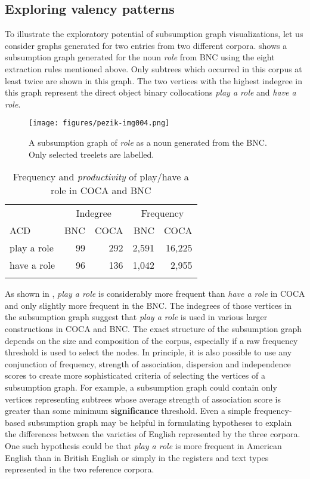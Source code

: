\documentclass[output=paper]{langscibook}
\begin{document}
\subsection{Exploring valency patterns}

To illustrate the exploratory potential of subsumption graph visualizations, let us consider graphs generated for two entries from two different corpora.  shows a subsumption graph generated for the noun \textit{role} from BNC using the eight extraction rules mentioned above. Only subtrees which occurred in this corpus at least twice are shown in this graph. The two vertices with the highest indegree in this graph represent the direct object binary collocations \textit{play a role} and \textit{have a role}. 

  
\begin{figure}[t]
\texttt{[image: figures/pezik-img004.png]}
\caption{A subsumption graph of \textit{role} as a noun generated from the BNC. Only selected treelets are labelled.\label{fig:pezik:4}}
\end{figure}


\begin{table}
\begin{tabular}{lrr rr}
\lsptoprule
& \multicolumn{2}{c}{Indegree} & \multicolumn{2}{c}{Frequency}\\\cmidrule(lr){2-3}\cmidrule(lr){4-5}
ACD & BNC & COCA & BNC & COCA\\\midrule
play a role & 99 & 292 & 2,591 & 16,225\\
have a role & 96 & 136 & 1,042 & 2,955\\
\lspbottomrule
\end{tabular}
\caption{\label{tab:pezik:11}Frequency and \textit{productivity} of play/have a role in COCA and BNC}
\end{table}

As shown in , \textit{play a role} is considerably more frequent than \textit{have a role} in COCA and only slightly more frequent in the BNC. The indegrees of those vertices in the subsumption graph suggest that \textit{play a role} is used in various larger constructions in COCA and BNC. The exact structure of the subsumption graph depends on the size and composition of the corpus, especially if a raw frequency threshold is used to select the nodes. In principle, it is also possible to use any conjunction of frequency, strength of association, dispersion and independence scores to create more sophisticated criteria of selecting the vertices of a subsumption graph. For example, a subsumption graph could contain only vertices representing subtrees whose average strength of association score is greater than some minimum \textbf{significance} threshold. Even a simple frequency-based subsumption graph may be helpful in formulating hypotheses to explain the differences between the varieties of English represented by the three corpora. One such hypothesis could be that \textit{play a role} is more frequent in American English than in British English or simply in the registers and text types represented in the two reference corpora.
\end{document}
